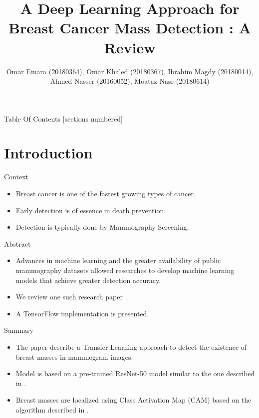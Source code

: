 \documentclass{beamer}
\title{A Deep Learning Approach for Breast Cancer Mass Detection : A Review}
\author{
  Omar Emara (20180364), Omar Khaled (20180367),
  Ibrahim Magdy (20180014), Ahmed Nasser (20160052), Moataz Nasr (20180614)
}
\date{}
\begin{document}
\maketitle

\begin{frame}{Table Of Contents}
  [sections numbered]
  \tableofcontents[hideallsubsections]
\end{frame}

\section{Introduction}

\begin{frame}{Context}
  \begin{itemize}
    \item Breast cancer is one of the fastest growing types of cancer.
    \item Early detection is of essence in death prevention.
    \item Detection is typically done by \alert{Mammography Screening}.
  \end{itemize}
\end{frame}

\begin{frame}{Abstract}
  \begin{itemize}
    \item Advances in machine learning and the greater availability of public
      mammography datasets allowed researches to develop machine learning
      models that achieve greater detection accuracy.
    \item We review one such research paper \alert{\autocite{Fathy2019}}.
    \item A TensorFlow implementation is presented.
  \end{itemize}
\end{frame}

\begin{frame}{Summary}
  \begin{itemize}
    \item The paper describe a \alert{Transfer Learning} approach to detect the
      existence of breast masses in mammogram images.
    \item Model is based on a pre-trained \alert{ResNet-50} model similar to
      the one described in \autocite{He2016}.
    \item Breast masses are localized using \alert{Class Activation Map (CAM)}
      based on the algorithm described in \autocite{Zhou2016}.
  \end{itemize}
\end{frame}
\end{document}
